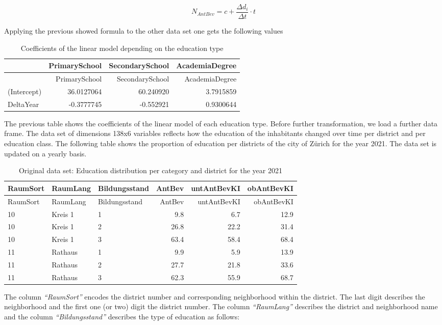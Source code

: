 \documentclass[
]{article}
\begin{document}
\[N_{AntBev} = c + \frac{\Delta d_{i}}{\Delta t} \cdot t \]

Applying the previous showed formula to the other data set one gets the
following values

\begin{longtable}[]{@{}lrrr@{}}
\caption{Coefficients of the linear model depending on the education
type}\tabularnewline
\toprule
& PrimarySchool & SecondarySchool & AcademiaDegree \\
\midrule
\endfirsthead
\toprule
& PrimarySchool & SecondarySchool & AcademiaDegree \\
\midrule
\endhead
(Intercept) & 36.0127064 & 60.240920 & 3.7915859 \\
DeltaYear & -0.3777745 & -0.552921 & 0.9300644 \\
\bottomrule
\end{longtable}

The previous table shows the coefficients of the linear model of each
education type. Before further transformation, we load a further data
frame. The data set of dimensions 138x6 variables reflects how the
education of the inhabitants changed over time per district and per
education class. The following table shows the proportion of education
per districts of the city of Zürich for the year 2021. The data set is
updated on a yearly basis.

\begin{longtable}[]{@{}lllrrr@{}}
\caption{Original data set: Education distribution per category and
district for the year 2021}\tabularnewline
\toprule
RaumSort & RaumLang & Bildungsstand & AntBev & untAntBevKI &
obAntBevKI \\
\midrule
\endfirsthead
\toprule
RaumSort & RaumLang & Bildungsstand & AntBev & untAntBevKI &
obAntBevKI \\
\midrule
\endhead
10 & Kreis 1 & 1 & 9.8 & 6.7 & 12.9 \\
10 & Kreis 1 & 2 & 26.8 & 22.2 & 31.4 \\
10 & Kreis 1 & 3 & 63.4 & 58.4 & 68.4 \\
11 & Rathaus & 1 & 9.9 & 5.9 & 13.9 \\
11 & Rathaus & 2 & 27.7 & 21.8 & 33.6 \\
11 & Rathaus & 3 & 62.3 & 55.9 & 68.7 \\
\bottomrule
\end{longtable}

The column \emph{``RaumSort''} encodes the district number and
corresponding neighborhood within the district. The last digit describes
the neighborhood and the first one (or two) digit the district number.
The column \emph{``RaumLang''} describes the district and neighborhood
name and the column \emph{``Bildungsstand''} describes the type of
education as follows:
\end{document}

